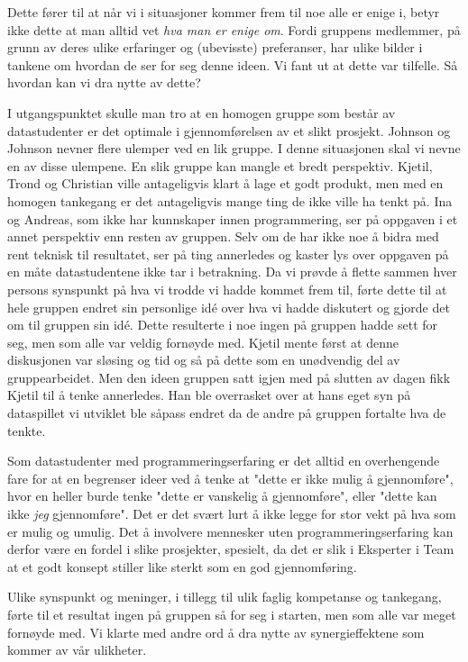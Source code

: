 	Dette fører til at når vi i situasjoner kommer frem til noe alle er enige i, betyr ikke dette at man alltid vet \emph{hva man er enige om}. Fordi gruppens medlemmer, på grunn av deres ulike erfaringer og (ubevisste) preferanser, har ulike bilder i tankene om hvordan de ser for seg denne ideen. Vi fant ut at dette var tilfelle. Så hvordan kan vi dra nytte av dette?

	I utgangspunktet skulle man tro at en homogen gruppe som består av datastudenter er det optimale i gjennomførelsen av et slikt prosjekt. Johnson og Johnson nevner flere ulemper ved en lik gruppe. I denne situasjonen skal vi nevne en av disse ulempene. En slik gruppe kan mangle et bredt perspektiv. Kjetil, Trond og Christian ville antageligvis klart å lage et godt produkt, men med en homogen tankegang er det antageligvis mange ting de ikke ville ha tenkt på. Ina og Andreas, som ikke har kunnskaper innen programmering, ser på oppgaven i et annet perspektiv enn resten av gruppen. Selv om de har ikke noe å bidra med rent teknisk til resultatet, ser på ting annerledes og kaster lys over oppgaven på en måte datastudentene ikke tar i betrakning. Da vi prøvde å flette sammen hver persons synspunkt på hva vi trodde vi hadde kommet frem til, førte dette til at hele gruppen endret sin personlige idé over hva vi hadde diskutert og gjorde det om til gruppen sin idé. Dette resulterte i noe ingen på gruppen hadde sett for seg, men som alle var veldig fornøyde med.  Kjetil mente først at denne diskusjonen var sløsing og tid og så på dette som en unødvendig del av gruppearbeidet. Men den ideen gruppen satt igjen med på slutten av dagen fikk Kjetil til å tenke annerledes. Han ble overrasket over at hans eget syn på dataspillet vi utviklet ble såpass endret da de andre på gruppen fortalte hva de tenkte. 


	Som datastudenter med programmeringserfaring er det alltid en overhengende fare for at en begrenser ideer ved å tenke at "dette er ikke mulig å gjennomføre", hvor en heller burde tenke "dette er vanskelig å gjennomføre", eller "dette kan ikke  \emph{jeg} gjennomføre". Det er det svært lurt å ikke legge for stor vekt på hva som er mulig og umulig. Det å involvere mennesker uten programmeringserfaring kan derfor være en fordel i slike prosjekter, spesielt, da det er slik i Eksperter i Team at et godt konsept stiller like sterkt som en god gjennomføring. 

	Ulike synspunkt og meninger, i tillegg til ulik faglig kompetanse og tankegang, førte til et resultat ingen på gruppen så for seg i starten, men som alle var meget fornøyde med. Vi klarte med andre ord å dra nytte av synergieffektene som kommer av vår ulikheter.